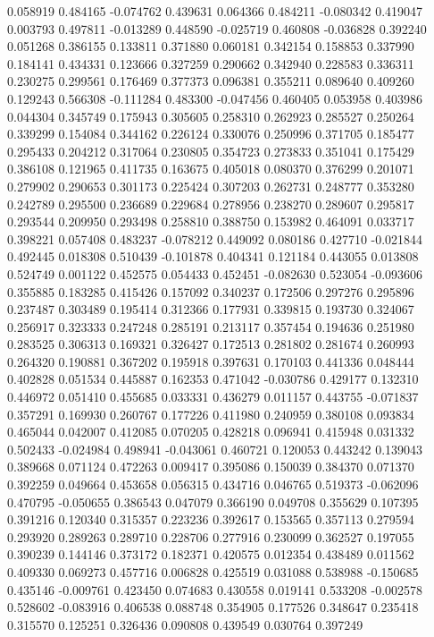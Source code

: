 0.058919
0.484165
-0.074762
0.439631
0.064366
0.484211
-0.080342
0.419047
0.003793
0.497811
-0.013289
0.448590
-0.025719
0.460808
-0.036828
0.392240
0.051268
0.386155
0.133811
0.371880
0.060181
0.342154
0.158853
0.337990
0.184141
0.434331
0.123666
0.327259
0.290662
0.342940
0.228583
0.336311
0.230275
0.299561
0.176469
0.377373
0.096381
0.355211
0.089640
0.409260
0.129243
0.566308
-0.111284
0.483300
-0.047456
0.460405
0.053958
0.403986
0.044304
0.345749
0.175943
0.305605
0.258310
0.262923
0.285527
0.250264
0.339299
0.154084
0.344162
0.226124
0.330076
0.250996
0.371705
0.185477
0.295433
0.204212
0.317064
0.230805
0.354723
0.273833
0.351041
0.175429
0.386108
0.121965
0.411735
0.163675
0.405018
0.080370
0.376299
0.201071
0.279902
0.290653
0.301173
0.225424
0.307203
0.262731
0.248777
0.353280
0.242789
0.295500
0.236689
0.229684
0.278956
0.238270
0.289607
0.295817
0.293544
0.209950
0.293498
0.258810
0.388750
0.153982
0.464091
0.033717
0.398221
0.057408
0.483237
-0.078212
0.449092
0.080186
0.427710
-0.021844
0.492445
0.018308
0.510439
-0.101878
0.404341
0.121184
0.443055
0.013808
0.524749
0.001122
0.452575
0.054433
0.452451
-0.082630
0.523054
-0.093606
0.355885
0.183285
0.415426
0.157092
0.340237
0.172506
0.297276
0.295896
0.237487
0.303489
0.195414
0.312366
0.177931
0.339815
0.193730
0.324067
0.256917
0.323333
0.247248
0.285191
0.213117
0.357454
0.194636
0.251980
0.283525
0.306313
0.169321
0.326427
0.172513
0.281802
0.281674
0.260993
0.264320
0.190881
0.367202
0.195918
0.397631
0.170103
0.441336
0.048444
0.402828
0.051534
0.445887
0.162353
0.471042
-0.030786
0.429177
0.132310
0.446972
0.051410
0.455685
0.033331
0.436279
0.011157
0.443755
-0.071837
0.357291
0.169930
0.260767
0.177226
0.411980
0.240959
0.380108
0.093834
0.465044
0.042007
0.412085
0.070205
0.428218
0.096941
0.415948
0.031332
0.502433
-0.024984
0.498941
-0.043061
0.460721
0.120053
0.443242
0.139043
0.389668
0.071124
0.472263
0.009417
0.395086
0.150039
0.384370
0.071370
0.392259
0.049664
0.453658
0.056315
0.434716
0.046765
0.519373
-0.062096
0.470795
-0.050655
0.386543
0.047079
0.366190
0.049708
0.355629
0.107395
0.391216
0.120340
0.315357
0.223236
0.392617
0.153565
0.357113
0.279594
0.293920
0.289263
0.289710
0.228706
0.277916
0.230099
0.362527
0.197055
0.390239
0.144146
0.373172
0.182371
0.420575
0.012354
0.438489
0.011562
0.409330
0.069273
0.457716
0.006828
0.425519
0.031088
0.538988
-0.150685
0.435146
-0.009761
0.423450
0.074683
0.430558
0.019141
0.533208
-0.002578
0.528602
-0.083916
0.406538
0.088748
0.354905
0.177526
0.348647
0.235418
0.315570
0.125251
0.326436
0.090808
0.439549
0.030764
0.397249
